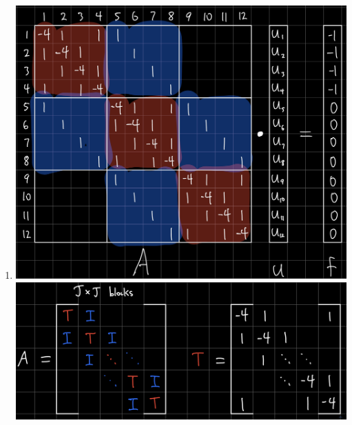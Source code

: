 \documentclass{article}
\begin{document}
\begin{enumerate}
\begin{enumerate}
	\item
	\includegraphics[scale=.1]{hw6 c full}
	\includegraphics[scale=.08]{hw6 c block}
	

\end{enumerate}
\end{enumerate}
\end{document}
